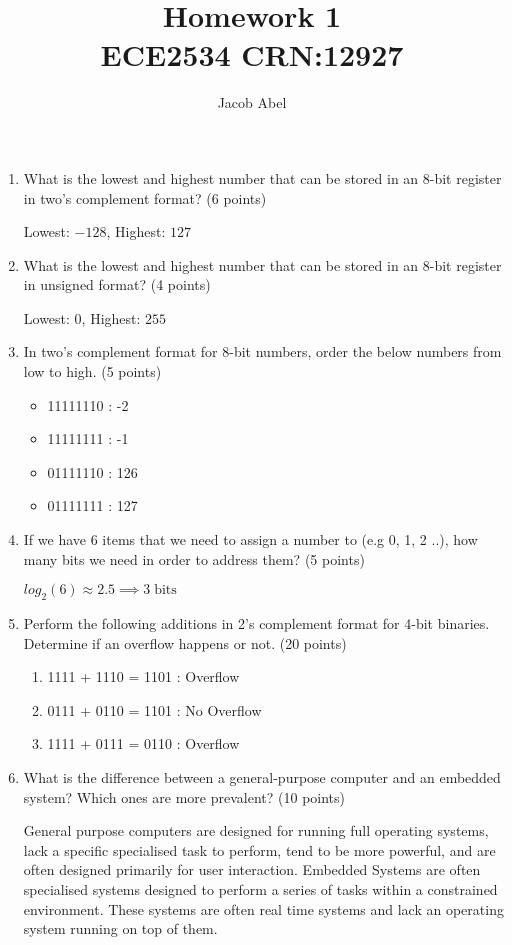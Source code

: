 \documentclass[12pt,letterpaper,titlepage]{article}
\author{Jacob Abel}
\title{	Homework 1
	\\\large ECE2534 CRN:12927
}
\begin{document}
\maketitle

\begin{enumerate}
\item What is the lowest and highest number that can be stored in an 8-bit register in two’s complement format? (6 points)

Lowest: $-128$, Highest: $127$

\item What is the lowest and highest number that can be stored in an 8-bit register in unsigned format? (4 points)

Lowest: $0$, Highest: $255$

\item In two’s complement format for 8-bit numbers, order the below numbers from low to high. (5 points)

  \begin{itemize}[noitemsep]
  \item 11111110 : -2
  \item 11111111 : -1
  \item 01111110 : 126
  \item 01111111 : 127
  \end{itemize}

\item If we have 6 items that we need to assign a number to (e.g 0, 1, 2 ..), how many bits we need in order to address them? (5 points)

$log_2(6) \approx 2.5 \implies 3\;\text{bits}$

\item Perform the following additions in 2's complement format for 4-bit binaries. Determine if an overflow happens or not. (20 points)

\begin{enumerate}[noitemsep, label=\Alph*]
\item 1111 + 1110 = 1101 : Overflow
\item 0111 + 0110 = 1101 : No Overflow
\item 1111 + 0111 = 0110 : Overflow
\end{enumerate}

\item What is the difference between a general-purpose computer and an embedded system? Which ones are more prevalent? (10 points)

General purpose computers are designed for running full operating systems, lack a specific specialised task to perform, tend to be more powerful, and are often designed primarily for user interaction. Embedded Systems are often specialised systems designed to perform a series of tasks within a constrained environment. These systems are often real time systems and lack an operating system running on top of them. 


\end{enumerate}
\end{document}
